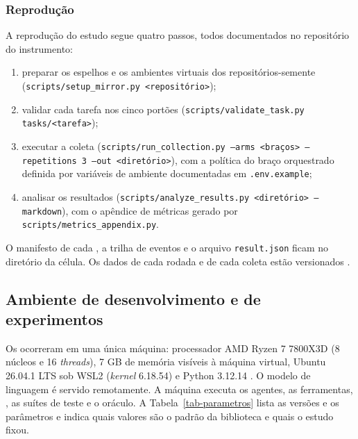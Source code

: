 \subsubsection{Reprodução}

A reprodução do estudo segue quatro passos, todos documentados no repositório do instrumento:

\begin{enumerate}
    \item preparar os espelhos e os ambientes virtuais dos repositórios-semente (\texttt{scripts/setup\_mirror.py <repositório>});
    \item validar cada tarefa nos cinco portões (\texttt{scripts/validate\_task.py tasks/<tarefa>});
    \item executar a coleta (\texttt{scripts/run\_collection.py --arms <braços> --repetitions 3 --out <diretório>}), com a política do braço orquestrado definida por variáveis de ambiente documentadas em \texttt{.env.example};
    \item analisar os resultados (\texttt{scripts/analyze\_results.py <diretório> --markdown}), com o apêndice de métricas gerado por \texttt{scripts/metrics\_appendix.py}.
\end{enumerate}

O manifesto de cada , a trilha de eventos e o arquivo \texttt{result.json} ficam no diretório da célula. Os dados de cada rodada e de cada coleta estão versionados .

\subsection{Ambiente de desenvolvimento e de experimentos}
\label{ssec:ambiente}

Os  ocorreram em uma única máquina: processador AMD Ryzen 7 7800X3D (8 núcleos e 16 \textit{threads}), 7 GB de memória visíveis à máquina virtual, Ubuntu 26.04.1 LTS sob WSL2 (\textit{kernel} 6.18.54) e Python 3.12.14 . O modelo de linguagem é servido remotamente. A máquina executa os agentes, as ferramentas, , as suítes de teste e o oráculo. A Tabela~\ref{tab-parametros} lista as versões e os parâmetros e indica quais valores são o padrão da biblioteca e quais o estudo fixou.

